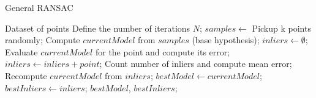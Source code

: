 \begin{algorithm}
\caption{General RANSAC}\label{alg:generic_ransac}
\begin{algorithmic}
\REQUIRE Dataset of points
\STATE Define the number of iterations $N$;
 \STATE $samples \gets$ Pickup k points randomly;
 \STATE Compute $currentModel$ from $samples$ (base hypothesis);
 \STATE $inliers \gets \emptyset$;
  \STATE Evaluate $currentModel$ for the point and compute its error;
   \STATE $inliers \gets inliers + point$;
  \ENDIF
 \ENDFOR
 \STATE Count number of inliers and compute mean error;
  \STATE Recompute $currentModel$ from $inliers$;
   \STATE $bestModel \gets currentModel$;
   \STATE $bestInliers \gets inliers$;
  \ENDIF
 \ENDIF
\ENDFOR
\RETURN $bestModel$, $bestInliers$;
\end{algorithmic}
\end{algorithm}


